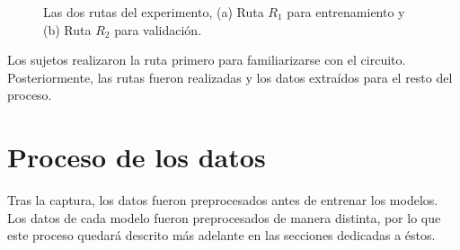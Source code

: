 \begin{figure}
	\centering
	\qquad
	\caption{Las dos rutas del experimento, (a) Ruta $R_1$ para entrenamiento y (b) Ruta $R_2$ para validación.}
	\label{fig:proposed-routes}
\end{figure}

Los sujetos realizaron la ruta primero para familiarizarse con el circuito. Posteriormente, las rutas fueron realizadas y los datos extraídos para el resto del proceso.

\section{Proceso de los datos}

Tras la captura, los datos fueron preprocesados antes de entrenar los modelos. Los datos de cada modelo fueron preprocesados de manera distinta, por lo que este proceso quedará descrito más adelante en las secciones dedicadas a éstos.
